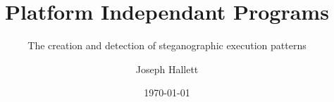 \documentclass{jahdoc}
\title{Platform Independant Programs}
\subtitle{The creation and detection of steganographic execution patterns}
\author{Joseph Hallett}
\date\today
\begin{document}
  \frontmatter
    \maketitle
    \begin{abstract}
      
    \end{abstract}
    \tableofcontents

  \mainmatter
    

    

    

    
    
    

    
    



\end{document}
